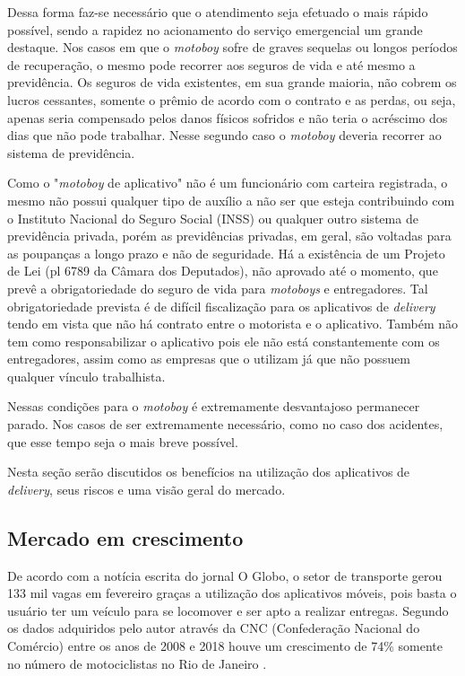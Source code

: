     




Dessa forma faz-se necessário que o atendimento seja efetuado o mais rápido possível, sendo a rapidez no acionamento do serviço emergencial um grande destaque. Nos casos em que o \textit{motoboy} sofre de graves sequelas ou longos períodos de  recuperação, o mesmo pode recorrer aos seguros de vida  e até mesmo a previdência. 
Os seguros de vida existentes, em sua grande maioria, não cobrem os lucros cessantes, somente o prêmio de acordo com o contrato e as perdas, ou seja, apenas seria compensado pelos danos físicos sofridos e não teria o acréscimo dos dias que não pode trabalhar. Nesse segundo caso o \textit{motoboy} deveria recorrer ao sistema de previdência. 

Como o "\textit{motoboy} de aplicativo" não é um funcionário com carteira registrada, o mesmo não possui qualquer tipo de auxílio a não ser que esteja contribuindo com o Instituto Nacional do Seguro Social (INSS) ou qualquer outro sistema de previdência privada, porém as previdências privadas, em geral, são voltadas para as poupanças a longo prazo e não de seguridade. 
Há a existência de um Projeto de Lei (pl 6789 da Câmara dos Deputados), não aprovado até o momento, que prevê a obrigatoriedade do seguro de vida para \textit{motoboys} e entregadores. Tal obrigatoriedade prevista é de difícil fiscalização para os aplicativos de \textit{delivery} tendo em vista que não há contrato entre o motorista e o aplicativo. Também não tem como responsabilizar o aplicativo pois ele não está constantemente com os entregadores, assim como as empresas que o utilizam já que não possuem qualquer vínculo trabalhista. 

Nessas condições para o \textit{motoboy} é extremamente desvantajoso permanecer parado. Nos casos de ser extremamente necessário, como no caso dos acidentes, que esse tempo seja o mais breve possível. 

Nesta seção serão discutidos os benefícios na utilização dos aplicativos de \textit{delivery}, seus riscos e uma visão geral do mercado.

\subsection{\textbf{Mercado em crescimento}}
De acordo com a notícia escrita  do jornal O Globo, o setor de transporte gerou 133 mil vagas em fevereiro graças a utilização dos aplicativos móveis, pois basta o usuário  ter um veículo para se locomover e ser apto a realizar entregas. Segundo os dados adquiridos pelo autor  através da CNC (Confederação Nacional do Comércio) entre os anos de 2008 e 2018 houve um crescimento de 74\% somente no número de motociclistas no Rio de Janeiro
\cite{costa2019s}.
